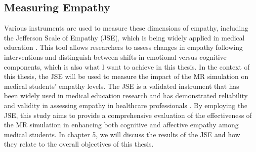 \subsection{Measuring Empathy}
Various instruments are used to measure these dimensions of empathy, including the Jefferson Scale of Empathy (JSE), which is being widely applied in medical education \cite{Alieldin2024}. This tool allows researchers to assess changes in empathy following interventions and distinguish between shifts in emotional versus cognitive components, which is also what I want to achieve in this thesis. In the context of this thesis, the JSE will be used to measure the impact of the MR simulation on medical students' empathy levels. The JSE is a validated instrument that has been widely used in medical education research and has demonstrated reliability and validity in assessing empathy in healthcare professionals \cite{Hojat2002}. By employing the JSE, this study aims to provide a comprehensive evaluation of the effectiveness of the MR simulation in enhancing both cognitive and affective empathy among medical students. In chapter 5, we will discuss the results of the JSE and how they relate to the overall objectives of this thesis.

